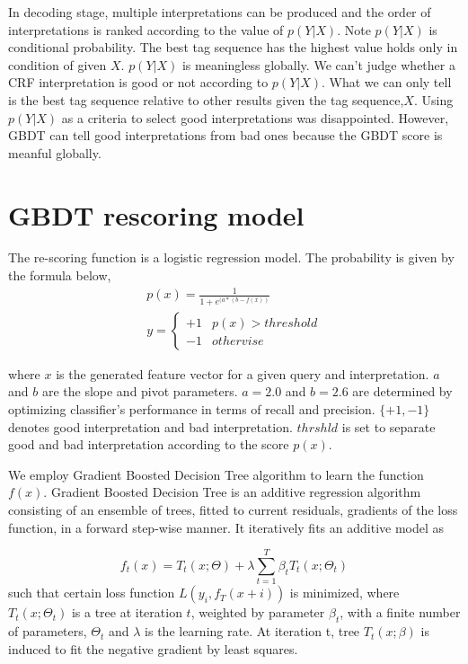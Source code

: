 \documentclass[11pt]{article}
\begin{document}
In decoding stage, multiple interpretations can be produced and the order of interpretations is ranked according to the value of $p(Y|X)$. Note $p(Y|X)$ is conditional probability. The best tag sequence has the highest value holds only in condition of given $X$. $p(Y|X)$ is meaningless globally. We can't judge whether a CRF interpretation is good or not according to $p(Y|X)$. What we can only tell  is the best tag sequence  relative to other results given the tag sequence,$X$.   Using $p(Y|X)$ as a criteria to select good interpretations was disappointed.  However, GBDT can tell good interpretations from bad ones because the GBDT score is meanful globally. 


\section{GBDT rescoring model}
\label{sec:gbdt}


The re-scoring function is a logistic regression model. The probability is given by the formula below,
\begin{equation}
\begin{array}{l}
p(x) = \frac{1}{1+e^{(a*(b-f(x))}}\\ 
y=\left \{\begin{array}{cc} +1 & p(x)> threshold \\ -1 & othervise \end{array}\right.
\label{eq:gbdt}
\end{array}
\end{equation}

where $x$ is the generated feature vector for a given query and interpretation. $a$ and $b$ are the slope and pivot parameters. $a=2.0$ and $b=2.6$ are determined by optimizing classifier's performance in terms of recall and precision. $\{+1,-1\}$ denotes good interpretation and bad interpretation. $thrshld$ is set to separate good and bad interpretation according to the score $p(x)$. 

We employ Gradient Boosted Decision Tree algorithm 
to learn the function $f(x)$. Gradient Boosted Decision Tree is an
additive regression algorithm consisting of an ensemble of trees,
fitted to current residuals, gradients of the loss function, in a
forward step-wise manner. It iteratively fits an additive model as

$$
f_t(x) = T_t(x; \Theta) + \lambda \sum_{t=1}^T \beta_t T_t(x; \Theta_t)
$$
\noindent such that certain loss function $L(y_i, f_T (x + i))$ is
minimized, where $T_t(x;\Theta_t)$ is a tree at iteration $t$,
weighted by parameter $\beta_t$, with a finite number of parameters,
$\Theta_t$ and $\lambda$ is the learning rate. At iteration t, tree
$T_t(x; \beta)$ is induced to fit the negative gradient by least
squares.
\end{document}
